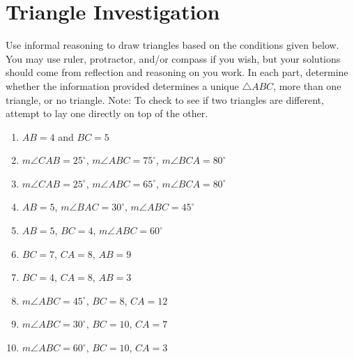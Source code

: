 \newpage

\section{Triangle Investigation}

\begin{prob}
Use informal reasoning to draw triangles based on the conditions given below.  You may use ruler, protractor, and/or compass if you wish, but your solutions should come from reflection and reasoning on you work.  In each part, determine whether the information provided determines a unique $\triangle ABC$, more than one triangle, or no triangle.   Note:  To check to see if two triangles are different, attempt to lay one directly on top of the other.  

\begin{enumerate}

\item $AB = 4$ and $BC = 5$
\item $m\angle CAB = 25^\circ$, $m\angle ABC = 75^\circ$, $m\angle BCA = 80^\circ$
\item $m\angle CAB = 25^\circ$, $m\angle ABC = 65^\circ$, $m\angle BCA = 80^\circ$
\item $AB = 5$, $m\angle BAC = 30^\circ$, $m\angle ABC = 45^\circ$
\item $AB = 5$, $BC = 4$, $m\angle ABC = 60^\circ$
\item $BC = 7$, $CA = 8$, $AB = 9$
\item $BC = 4$, $CA = 8$, $AB = 3$
\item $m\angle ABC = 45^\circ$, $BC = 8$, $CA = 12$
\item $m\angle ABC = 30^\circ$, $BC = 10$, $CA = 7$
\item $m\angle ABC = 60^\circ$, $BC = 10$, $CA = 3$

\end{enumerate}

\end{prob}
